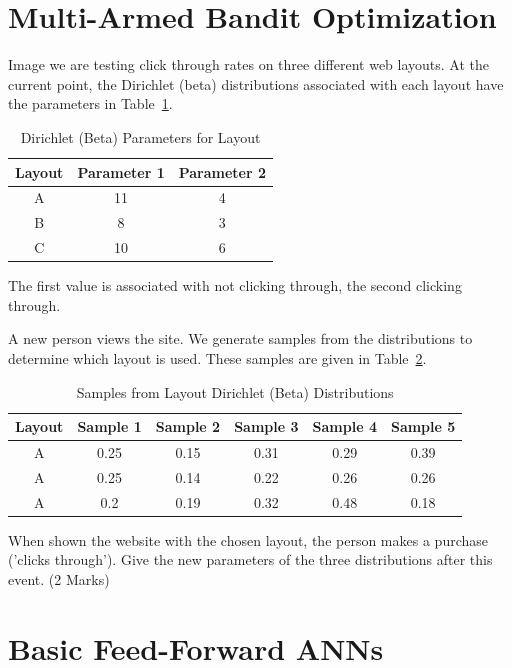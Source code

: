 \documentclass{article}
\begin{document}
\section{Multi-Armed Bandit Optimization}

Image we are testing click through rates on three different web layouts. At the current point, the Dirichlet (beta) distributions associated with each layout have the parameters in Table~\ref{MABO1}.\begin{table}[h!]
\caption{Dirichlet (Beta) Parameters for Layout}
\label{MABO1}
\begin{center}
\begin{tabular}{ |c|c|c| } 
\hline
 Layout & Parameter 1 & Parameter 2 \\
\hline
A &  11  &  4 \\
B &  8  &  3 \\
C &  10  &  6 \\
\hline
\end{tabular}
\end{center}
\end{table}

The first value is associated with not clicking through, the second clicking through.

A new person views the site. We generate samples from the distributions to determine which layout is used. These samples are given in Table~\ref{MABO2}.
\begin{table}[h!]
\caption{Samples from Layout Dirichlet (Beta) Distributions}
\label{MABO2}
\begin{center}
\begin{tabular}{ |c|c|c|c|c|c| } 
\hline
 Layout & Sample 1 & Sample 2 & Sample 3 & Sample 4 & Sample 5 \\
\hline
A &  0.25  &  0.15  &  0.31  &  0.29  &  0.39 \\
A &  0.25  &  0.14  &  0.22  &  0.26  &  0.26 \\
A &  0.2  &  0.19  &  0.32  &  0.48  &  0.18 \\
\hline
\end{tabular}
\end{center}
\end{table}


When shown the website with the chosen layout, the person makes a purchase ('clicks through'). Give the new parameters of the three distributions after this event. (2 Marks)
\clearpage
\section{Basic Feed-Forward ANNs}
\end{document}
